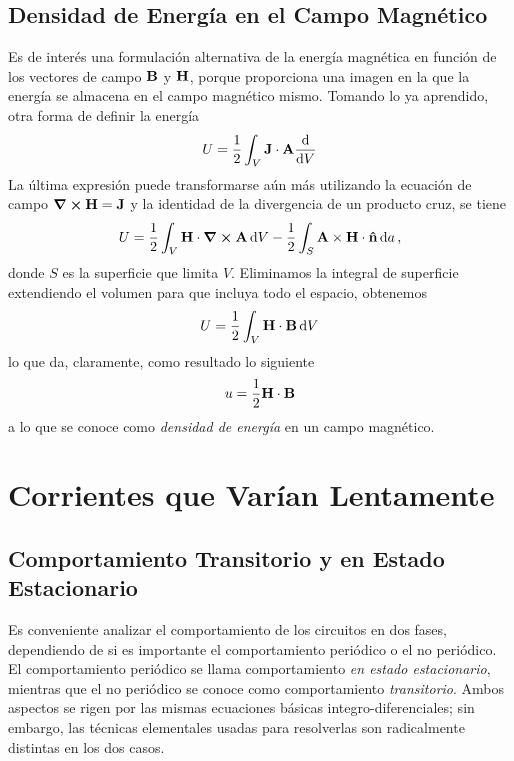 \section{Densidad de Energía en el Campo Magnético}
Es de interés una formulación alternativa de la energía magnética en función de los vectores de campo $\vb{B}$ y $\vb{H}$, porque proporciona una imagen en la que la energía se almacena en el campo magnético mismo. Tomando lo ya aprendido, otra forma de definir la energía
\begin{equation}
    U = \frac{1}{2} \int _V \vb{J} \cdot \vb{A} \dv{V}
\end{equation}
La última expresión puede transformarse aún más utilizando la ecuación de campo $\curl{\vb{H}} = \vb{J}$ y la identidad de la divergencia de un producto cruz, se tiene
\begin{equation}
    U = \frac{1}{2} \int _V \vb{H} \cdot \curl{\vb{A}} \dd{V} - \frac{1}{2} \int _S \vb{A} \times \vb{H} \cdot \vu{n} \dd{a},
\end{equation}
donde $S$ es la superficie que limita $V$. Eliminamos la integral de superficie extendiendo el volumen para que incluya todo el espacio, obtenemos
\begin{equation}
    U = \frac{1}{2} \int _V \vb{H} \cdot \vb{B} \dd{V}
\end{equation}
lo que da, claramente, como resultado lo siguiente
\begin{equation}
    u = \frac{1}{2} \vb{H} \cdot \vb{B}
\end{equation}
a lo que se conoce como \textit{densidad de energía} en un campo magnético.




\chapter{Corrientes que Varían Lentamente}
\section{Comportamiento Transitorio y en Estado Estacionario}
Es conveniente analizar el comportamiento de los circuitos en dos fases, dependiendo de si es importante el comportamiento periódico o el no periódico. El comportamiento periódico se llama comportamiento \textit{en estado estacionario}, mientras que el no periódico se conoce como comportamiento \textit{transitorio}. Ambos aspectos se rigen por las mismas ecuaciones básicas integro-diferenciales; sin embargo, las técnicas elementales usadas para resolverlas son radicalmente distintas en los dos casos.

